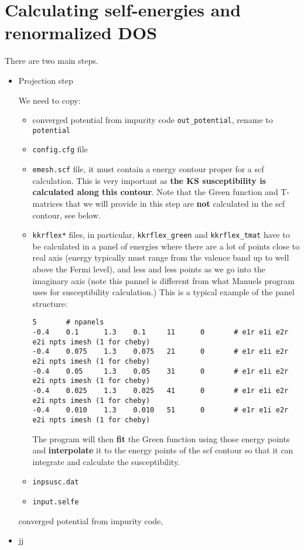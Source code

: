 \documentclass[11pt,fleqn]{book} %
\begin{document}
\section{Calculating self-energies and renormalized DOS}

There are two main steps.
\begin{itemize}
\item Projection step

We need to copy:
\begin{itemize}
\item converged potential from impurity code \verb|out_potential|, rename to \verb|potential|
\item \verb|config.cfg| file

\item \verb|emesh.scf| file, it must contain a energy contour proper for a scf calculation.
This is very important as
\textbf{the KS susceptibility is calculated along this contour}. Note that the
Green function and T-matrices that we will provide in this step are \textbf{not}
calculated in the scf contour, see below.

\item \verb|kkrflex*| files, in particular, \verb|kkrflex_green| and \verb|kkrflex_tmat|
have to be calculated in a panel of energies where there are a lot of points close to real axis
(energy typically must range from the valence band up to well above the Fermi level),
and less and less points as we go into the imaginary axis (note this pannel is different from
what Manuels program uses for susceptibility calculation.) This
is a typical example of the panel structure:
\begin{VBox}
\begin{verbatim}
5       # npanels
-0.4    0.1      1.3    0.1     11      0       # e1r e1i e2r e2i npts imesh (1 for cheby)
-0.4    0.075    1.3    0.075   21      0       # e1r e1i e2r e2i npts imesh (1 for cheby)
-0.4    0.05     1.3    0.05    31      0       # e1r e1i e2r e2i npts imesh (1 for cheby)
-0.4    0.025    1.3    0.025   41      0       # e1r e1i e2r e2i npts imesh (1 for cheby)
-0.4    0.010    1.3    0.010   51      0       # e1r e1i e2r e2i npts imesh (1 for cheby)
\end{verbatim}
\end{VBox}
The program will then \textbf{fit} the Green function using those energy points
and \textbf{interpolate} it to the energy points of the scf contour so that it can
integrate and calculate the susceptibility.

\item \verb|inpsusc.dat|

\item \verb|input.selfe|

\end{itemize}
converged potential from impurity code,

\item jj
\end{itemize}
\end{document}
